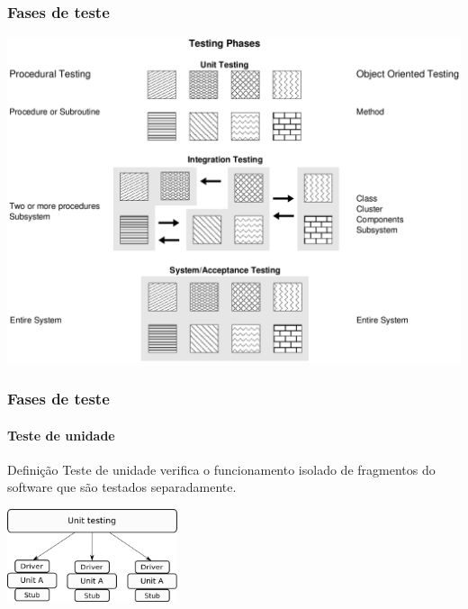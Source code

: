 \begin{frame}[c]
\frametitle{Fases de teste}

\begin{block:fact}{}
    \centering
    \includegraphics[scale=.3]{teste-de-software/conceitos-basicos/Imagens/fases-de-teste}
\end{block:fact}
\end{frame}


\begin{frame}
\frametitle{Fases de teste}
\framesubtitle{Teste de unidade}
\label{concept:unit-testing}

\begin{block:concept}{Definição}
Teste de unidade verifica o funcionamento isolado de fragmentos do software que são testados separadamente.
\end{block:concept}

\begin{block:fact}{}
    \centering
    \includegraphics[width=5cm]{teste-de-software/conceitos-basicos/Imagens/teste-unitario}
\end{block:fact}

\hfill
{}
\end{frame}


